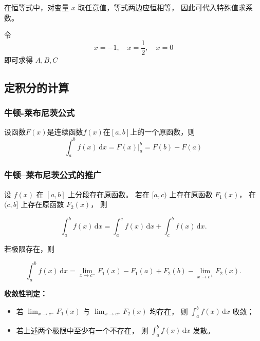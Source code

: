 \documentclass[a4paper,12pt]{article}
\begin{document}
\begin{enumerate}
\begin{circlenum}
\begin{analysisbox}[Example]
                      在恒等式中，对变量 $x$ 取任意值，等式两边应恒相等，
                      因此可代入特殊值求系数。

                      令
                      \[
                          x = -1,
                          \quad
                          x = \frac{1}{2},
                          \quad
                          x = 0
                      \]
                      即可求得 $A, B, C$
            \end{analysisbox}
        \end{circlenum}
    \end{enumerate}

    \subsection{定积分的计算}

    \subsubsection{牛顿-莱布尼茨公式}
    设函数$F(x)$是连续函数$f(x)$在$[a, b]$上的一个原函数，则
    \[
        \int_a^b f(x)\,\mathrm{d}x = F(x)\Big|_{a}^{b} = F(b) - F(a)
    \]

    \subsubsection{牛顿–莱布尼茨公式的推广}

    设 $f(x)$ 在 $[a,b]$ 上分段存在原函数。
    若在 $[a,c)$ 上存在原函数 $F_1(x)$，
    在 $(c,b]$ 上存在原函数 $F_2(x)$，
    则

    \[
        \int_a^b f(x)\,\mathrm{d}x
        =
        \int_a^c f(x)\,\mathrm{d}x
        +
        \int_c^b f(x)\,\mathrm{d}x.
    \]

    若极限存在，则

    \[
        \int_a^b f(x)\,\mathrm{d}x
        =
        \lim_{x \to c^-} F_1(x) - F_1(a)
        +
        F_2(b) - \lim_{x \to c^+} F_2(x).
    \]

    \medskip

    \textbf{收敛性判定：}

    \begin{itemize}
        \item 若 $\displaystyle \lim_{x \to c^-} F_1(x)$ 与
        $\displaystyle \lim_{x \to c^+} F_2(x)$ 均存在，
        则 $\displaystyle \int_a^b f(x)\,\mathrm{d}x$ 收敛；

        \item 若上述两个极限中至少有一个不存在，
        则 $\displaystyle \int_a^b f(x)\,\mathrm{d}x$ 发散。
    \end{itemize}
\end{document}
